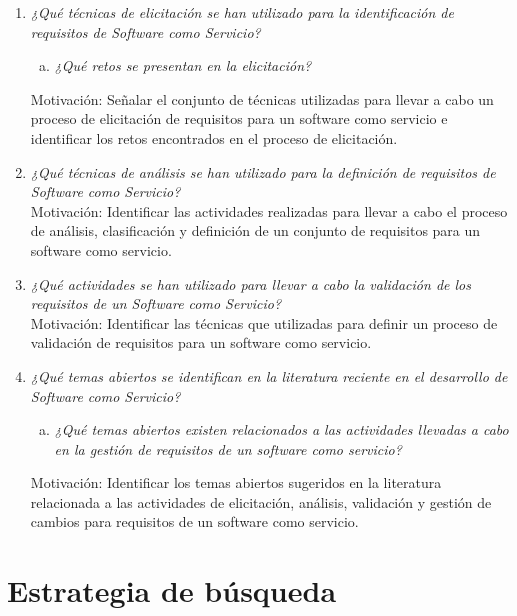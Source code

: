 \documentclass{article}
\begin{document}
\begin{enumerate}[P 1.-]
  \item\emph{¿Qué técnicas de elicitación se han utilizado para la identificación de requisitos de Software como Servicio?}
  \begin{enumerate}[(a)]
  \item \emph{¿Qué retos se presentan en la elicitación?}
  \end{enumerate}
  Motivación: Señalar el conjunto de técnicas utilizadas para llevar a cabo un proceso de elicitación de requisitos para un software como servicio e identificar los retos encontrados en el proceso de elicitación. 
  
  \item\emph{¿Qué técnicas de análisis se han utilizado para la definición de requisitos de Software como Servicio?}\\
  Motivación: Identificar las actividades realizadas para llevar a cabo el proceso de análisis, clasificación y definición de un conjunto de requisitos para un software como servicio.

  \item\emph{¿Qué actividades se han utilizado para llevar a cabo la validación de los requisitos de un Software como Servicio?}\\
  Motivación: Identificar las técnicas que utilizadas para definir un proceso de validación de requisitos para un software como servicio.

  \item\emph{¿Qué temas abiertos se identifican en la literatura reciente en el desarrollo de Software como Servicio?}
  \begin{enumerate}[(a)]
  \item \emph{¿Qué temas abiertos existen relacionados a las actividades llevadas a cabo en la gestión de requisitos de un software como servicio?}
  \end{enumerate}
  Motivación: Identificar los temas abiertos sugeridos en la literatura relacionada a las actividades de elicitación, análisis, validación y gestión de cambios 
 para requisitos de un software como servicio.
\end{enumerate}

\newpage 


\section{Estrategia de búsqueda}\label{Estrategia de búsqueda}
\end{document}
